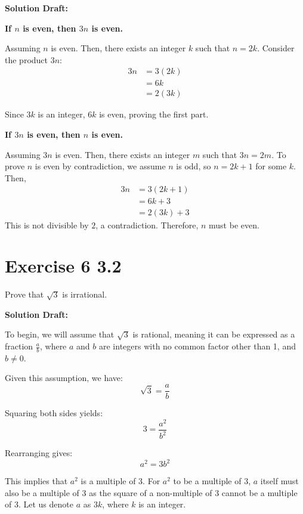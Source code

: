 \documentclass{article}
\begin{document}
\vspace{0.5cm}
\noindent\textbf{Solution Draft:} 
\vspace{0.2cm}

\textbf{If \(n\) is even, then \(3n\) is even.}


Assuming \(n\) is even. Then, there exists an integer \(k\) such that \(n = 2k\). Consider the product \(3n\):
\begin{align*}
    3n &= 3(2k) \\
    &= 6k \\
    &= 2(3k)
    \end{align*}
    
Since \(3k\) is an integer, \(6k\) is even, proving the first part.
\vspace{0.2cm}

\textbf{If \(3n\) is even, then \(n\) is even.}


Assuming \(3n\) is even. Then, there exists an integer \(m\) such that \(3n = 2m\). To prove \(n\) is even by contradiction, we assume \(n\) is odd, so \(n = 2k + 1\) for some \(k\). Then, 
\begin{align*}
    3n &= 3(2k + 1) \\
    &= 6k + 3 \\
    &= 2(3k) + 3
    \end{align*}    
This is not divisible by \(2\), a contradiction. Therefore, \(n\) must be even.


\section*{Exercise 6 3.2}  

Prove that \(\sqrt 3\) is irrational.


\vspace{0.5cm}
\noindent\textbf{Solution Draft:} 
\vspace{0.2cm}

To begin, we will assume that \(\sqrt{3}\) is rational, meaning it can be expressed as a fraction \(\frac{a}{b}\), where \(a\) and \(b\) are integers with no common factor other than 1, and \(b \neq 0\).

Given this assumption, we have:
\[\sqrt{3} = \frac{a}{b}\]

Squaring both sides yields:
\[3 = \frac{a^2}{b^2}\]

Rearranging gives:
\[a^2 = 3b^2\]

This implies that \(a^2\) is a multiple of 3. For \(a^2\) to be a multiple of 3, \(a\) itself must also be a multiple of 3 as the square of a non-multiple of 3 cannot be a multiple of 3. Let us denote \(a\) as \(3k\), where \(k\) is an integer.
\end{document}
